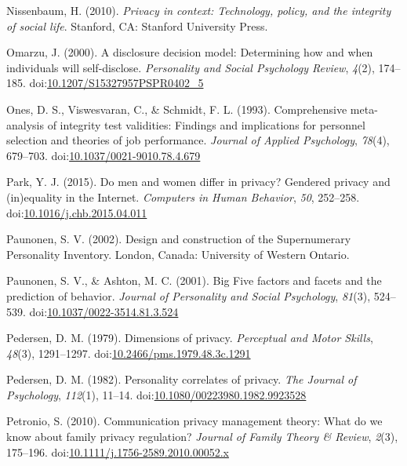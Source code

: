 \documentclass[man,floatsintext]{apa6}
\begin{document}
\leavevmode\hypertarget{ref-Nissenbaum.2010}{}%
Nissenbaum, H. (2010). \emph{Privacy in context: Technology, policy, and the integrity of social life}. Stanford, CA: Stanford University Press.

\leavevmode\hypertarget{ref-Omarzu.2000}{}%
Omarzu, J. (2000). A disclosure decision model: Determining how and when individuals will self-disclose. \emph{Personality and Social Psychology Review}, \emph{4}(2), 174--185. doi:\href{https://doi.org/10.1207/S15327957PSPR0402_5}{10.1207/S15327957PSPR0402\_5}

\leavevmode\hypertarget{ref-Ones.1993}{}%
Ones, D. S., Viswesvaran, C., \& Schmidt, F. L. (1993). Comprehensive meta-analysis of integrity test validities: Findings and implications for personnel selection and theories of job performance. \emph{Journal of Applied Psychology}, \emph{78}(4), 679--703. doi:\href{https://doi.org/10.1037/0021-9010.78.4.679}{10.1037/0021-9010.78.4.679}

\leavevmode\hypertarget{ref-Park.2015}{}%
Park, Y. J. (2015). Do men and women differ in privacy? Gendered privacy and (in)equality in the Internet. \emph{Computers in Human Behavior}, \emph{50}, 252--258. doi:\href{https://doi.org/10.1016/j.chb.2015.04.011}{10.1016/j.chb.2015.04.011}

\leavevmode\hypertarget{ref-Paunonen.2002}{}%
Paunonen, S. V. (2002). Design and construction of the Supernumerary Personality Inventory. London, Canada: University of Western Ontario.

\leavevmode\hypertarget{ref-Paunonen.2001}{}%
Paunonen, S. V., \& Ashton, M. C. (2001). Big Five factors and facets and the prediction of behavior. \emph{Journal of Personality and Social Psychology}, \emph{81}(3), 524--539. doi:\href{https://doi.org/10.1037/0022-3514.81.3.524}{10.1037/0022-3514.81.3.524}

\leavevmode\hypertarget{ref-Pedersen.1979}{}%
Pedersen, D. M. (1979). Dimensions of privacy. \emph{Perceptual and Motor Skills}, \emph{48}(3), 1291--1297. doi:\href{https://doi.org/10.2466/pms.1979.48.3c.1291}{10.2466/pms.1979.48.3c.1291}

\leavevmode\hypertarget{ref-Pedersen.1982}{}%
Pedersen, D. M. (1982). Personality correlates of privacy. \emph{The Journal of Psychology}, \emph{112}(1), 11--14. doi:\href{https://doi.org/10.1080/00223980.1982.9923528}{10.1080/00223980.1982.9923528}

\leavevmode\hypertarget{ref-Petronio.2010}{}%
Petronio, S. (2010). Communication privacy management theory: What do we know about family privacy regulation? \emph{Journal of Family Theory \& Review}, \emph{2}(3), 175--196. doi:\href{https://doi.org/10.1111/j.1756-2589.2010.00052.x}{10.1111/j.1756-2589.2010.00052.x}
\end{document}
